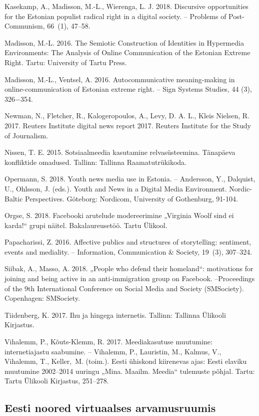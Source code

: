 \documentclass[estonian,]{article}
\begin{document}
Kasekamp, A., Madisson, M.-L., Wierenga, L. J. 2018. Discursive opportunities for the Estonian populist radical right in a digital society. -- Problems of Post-Communism, 66~(1), 47--58.

Madisson, M.-L. 2016. The Semiotic Construction of Identities in Hypermedia Environments: The Analysis of Online Communication of the Estonian Extreme Right. Tartu: University of Tartu Press.

Madisson, M.-L., Ventsel, A. 2016. Autocommunicative meaning-making in online-communication of Estonian extreme right. -- Sign Systems Studies, 44 (3), 326−354.

Newman, N., Fletcher, R., Kalogeropoulos, A., Levy, D. A. L., Kleis Nielsen, R. 2017. Reuters Institute digital news report 2017. Reuters Institute for the Study of Journalism.

Nissen, T. E. 2015. Sotsiaalmeedia kasutamine relvasüsteemina. Tänapäeva konfliktide omadused. Tallinn: Tallinna Raamatutrükikoda.

Opermann, S. 2018. Youth news media use in Estonia. -- Andersson, Y., Dalquist, U., Ohlsson, J. (eds.). Youth and News in a Digital Media Environment. Nordic-Baltic Perspectives. Göteborg: Nordicom, University of Gothenburg, 91-104.

Orgse, S. 2018. Facebooki arutelude modereerimine „Virginia Woolf sind ei karda!`` grupi näitel. Bakalaureusetöö. Tartu Ülikool.

Papacharissi, Z. 2016. Affective publics and structures of storytelling: sentiment, events and mediality. -- Information, Communication \& Society, 19~(3), 307--324.

Siibak, A., Masso, A. 2018. „People who defend their homeland``: motivations for joining and being active in an anti-immigration group on Facebook. --Proceedings of the 9th International Conference on Social Media and Society (SMSociety). Copenhagen: SMSociety.

Tiidenberg, K. 2017. Ihu ja hingega internetis. Tallinn: Tallinna Ülikooli Kirjastus.

Vihalemm, P., Kõuts-Klemm, R. 2017. Meediakasutuse muutumine: internetiajastu saabumine. -- Vihalemm, P., Lauristin, M., Kalmus, V., Vihalemm, T., Keller,~M. (toim.). Eesti ühiskond kiirenevas ajas: Eesti elaviku muutumine 2002--2014 uuringu „Mina. Maailm. Meedia`` tulemuste põhjal. Tartu: Tartu Ülikooli Kirjastus, 251--278.

\hypertarget{eesti-noored-virtuaalses-arvamusruumis}{%
\subsection{Eesti noored virtuaalses arvamusruumis}\label{eesti-noored-virtuaalses-arvamusruumis}}
\end{document}
